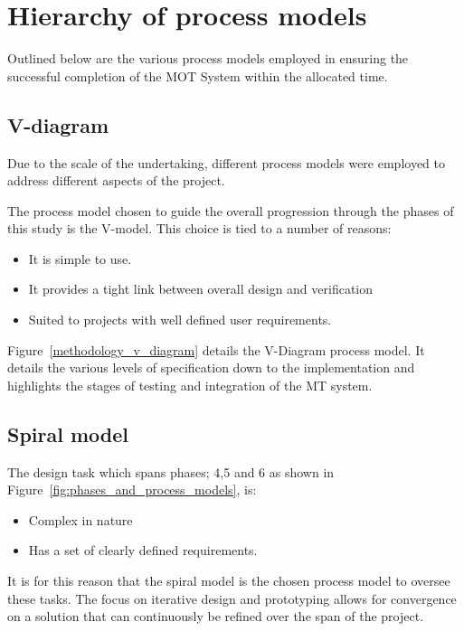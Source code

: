 \section{Hierarchy of process models}
Outlined below are the various process models employed in ensuring the
successful completion of the MOT System within the allocated time.

\subsection{V-diagram}
Due to the scale of the undertaking, different process models were employed to
address different aspects of the project.

The process model chosen to guide the overall progression through the phases of
this study is the V-model. This choice is tied to a number of reasons: 
\begin{itemize}
    \item It is simple to use.
    \item It provides a tight link between overall design and verification 
    \item Suited to projects with well defined user requirements.
\end{itemize}

Figure~\ref{methodology_v_diagram} details the V-Diagram process model. It
details the various levels of specification down to the implementation and
highlights the stages of testing and integration of the MT system.



\subsection{Spiral model}
The design task which spans phases; 4,5 and 6 as shown in Figure~\ref{fig:phases_and_process_models}, is: 
\begin{itemize}
    \item Complex in nature
    \item Has a set of clearly defined requirements. 
\end{itemize}

It is for this reason that the spiral model is the chosen process model to
oversee these tasks. The focus on iterative design and prototyping allows for
convergence on a solution that can continuously be refined over the span of the
project.

